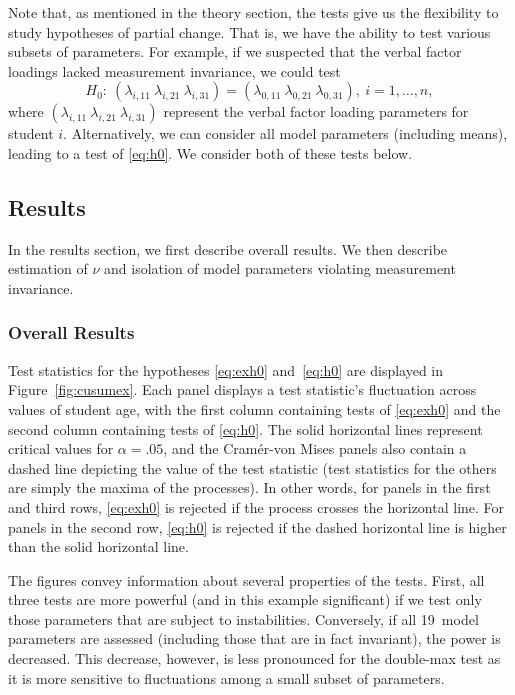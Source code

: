 \documentclass[man]{apa}
\begin{document}
Note that, as mentioned in the theory section, the 
tests give us the flexibility to study hypotheses of partial change.
That is, we have the ability to 
test various subsets of 
parameters.  For example, if we suspected that the verbal factor loadings
lacked measurement invariance, we could test
\begin{equation}
    \label{eq:exh0}
H_0:\ (\lambda_{i,11}\ \lambda_{i,21}\ \lambda_{i,31}) =
(\lambda_{0, 11}\ \lambda_{0, 21}\ \lambda_{0, 31}),\ i=1,\ldots,n,
\end{equation}
where $(\lambda_{i,11}\ \lambda_{i,21}\ \lambda_{i,31})$ represent the
verbal factor loading parameters for student $i$.  Alternatively, we
can consider all model parameters (including means), leading to a test
of \eqref{eq:h0}.  We consider both of these tests below.

\subsection{Results}
In the results section, we first describe overall results.  We then 
describe estimation of $\nu$ and 
isolation of model parameters violating
measurement invariance.

\subsubsection{Overall Results}
Test statistics for the hypotheses \eqref{eq:exh0} and~\eqref{eq:h0}
are displayed in  
Figure~\ref{fig:cusumex}.
Each panel displays a test 
statistic's fluctuation across values of student age, with the first
column containing tests of \eqref{eq:exh0} and the second column
containing tests of \eqref{eq:h0}.  The solid
horizontal 
lines represent critical values for $\alpha=.05$, and
the Cram\'{e}r-von Mises panels 
also contain a dashed line depicting the value of the test
statistic (test statistics for the others are simply 
the maxima of the processes).
In other words, for panels in the first and third rows, \eqref{eq:exh0} is
rejected if the process crosses the horizontal line.  For panels in
the second row, \eqref{eq:h0} is rejected if the dashed horizontal line is
higher than the solid horizontal line.

The figures convey information about several properties
of the tests. First, all three tests are more powerful (and in
this example significant) if we test only those parameters 
that are subject to instabilities. Conversely, if all 19~model
parameters are assessed (including those that are in fact invariant),
the power is decreased. This decrease, however, is less pronounced
for the double-max test as it is more 
sensitive to fluctuations among a small subset of parameters.
\end{document}
